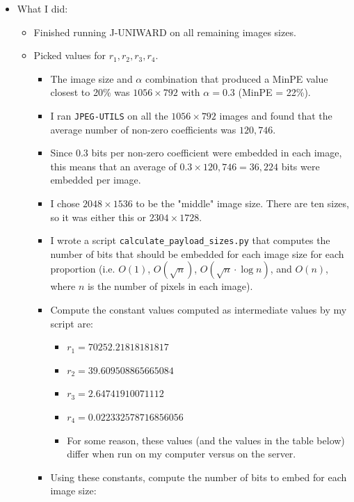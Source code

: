 \documentclass[11pt,a4paper]{report}
\begin{document}
\begin{itemize}

  \item What I did:
    \begin{itemize}
      \item Finished running J-UNIWARD on all remaining images sizes.
      \item Picked values for $r_1, r_2, r_3, r_4$.
        \begin{itemize}
          \item The image size and $\alpha$ combination that produced a MinPE value closest to 20\% was $1056\times792$ with $\alpha=0.3$ (MinPE = 22\%).
          \item I ran \texttt{JPEG-UTILS} on all the $1056\times792$ images and found that the average number of non-zero coefficients was $120,746$.
          \item Since 0.3 bits per non-zero coefficient were embedded in each image, this means that an average of $0.3 \times 120,746 = 36,224$ bits were embedded per image.
          \item I chose $2048 \times 1536$ to be the "middle" image size. There are ten sizes, so it was either this or $2304 \times 1728$.
          \item I wrote a script \texttt{calculate\_payload\_sizes.py} that computes the number of bits that should be embedded for each image size for each proportion (i.e. $O(1)$, $O(\sqrt{n})$, $O(\sqrt{n} \cdot \log n)$, and $O(n)$, where $n$ is the number of pixels in each image).
          \item Compute the constant values computed as intermediate values by my script are:
            \begin{itemize}
              \item $r_1 = 70252.21818181817$
              \item $r_2 = 39.609508865665084$
              \item $r_3 = 2.64741910071112$
              \item $r_4 = 0.022332578716856056$
              \item For some reason, these values (and the values in the table below) differ when run on my computer versus on the server.
            \end{itemize}
          \item Using these constants, compute the number of bits to embed for each image size:
          \begin{center}
            \begin{tabular}{ c c c | c c c c }

\end{tabular}
\end{center}
\end{itemize}
\end{itemize}
\end{itemize}
\end{document}

